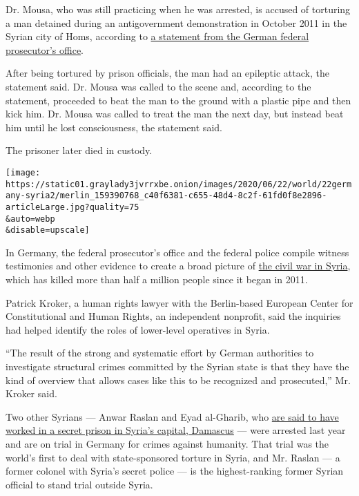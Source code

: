 Dr. Mousa, who was still practicing when he was arrested, is accused of
torturing a man detained during an antigovernment demonstration in
October 2011 in the Syrian city of Homs, according to
\href{https://www.generalbundesanwalt.de/SharedDocs/Pressemitteilungen/DE/aktuelle/Pressemitteilung-vom-22-06-2020.html;jsessionid=BA8A3B5E3F218468ECCE68602B83CC80.intranet251}{a
statement from the German federal prosecutor's office}.

After being tortured by prison officials, the man had an epileptic
attack, the statement said. Dr. Mousa was called to the scene and,
according to the statement, proceeded to beat the man to the ground with
a plastic pipe and then kick him. Dr. Mousa was called to treat the man
the next day, but instead beat him until he lost consciousness, the
statement said.

The prisoner later died in custody.

\texttt{[image: https://static01.graylady3jvrrxbe.onion/images/2020/06/22/world/22germany-syria2/merlin\_159390768\_c40f6381-c655-48d4-8c2f-61fd0f8e2896-articleLarge.jpg?quality=75\\\&auto=webp\\\&disable=upscale]}

In Germany, the federal prosecutor's office and the federal police
compile witness testimonies and other evidence to create a broad picture
of
\href{https://www.nytimes3xbfgragh.onion/2016/08/27/world/middleeast/syria-civil-war-why-get-worse.html}{the
civil war in Syria}, which has killed more than half a million people
since it began in 2011.

Patrick Kroker, a human rights lawyer with the Berlin-based European
Center for Constitutional and Human Rights, an independent nonprofit,
said the inquiries had helped identify the roles of lower-level
operatives in Syria.

``The result of the strong and systematic effort by German authorities
to investigate structural crimes committed by the Syrian state is that
they have the kind of overview that allows cases like this to be
recognized and prosecuted,'' Mr. Kroker said.

Two other Syrians --- Anwar Raslan and Eyad al-Gharib, who
\href{https://www.nytimes3xbfgragh.onion/2020/04/23/world/middleeast/syria-germany-war-crimes-trial.html?searchResultPosition=2}{are
said to have worked in a secret prison in Syria's capital, Damascus} ---
were arrested last year and are on trial in Germany for crimes against
humanity. That trial was the world's first to deal with state-sponsored
torture in Syria, and Mr. Raslan --- a former colonel with Syria's
secret police --- is the highest-ranking former Syrian official to stand
trial outside Syria.

